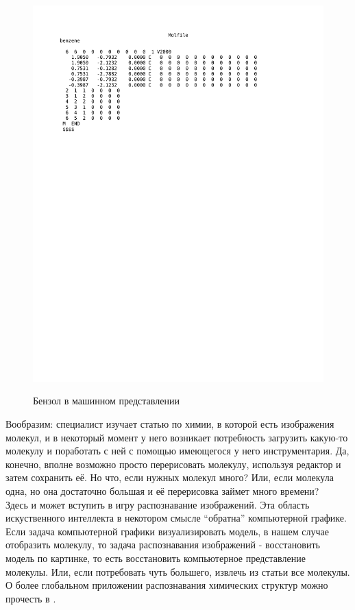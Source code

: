 \begin{figure}[h]
{\includegraphics[scale=0.6, clip, trim = 10mm 180mm 45mm 10mm]{img/benzene_molfile.pdf}}
\caption{Бензол в машинном представлении}
\end{figure}

\noindent Вообразим: специалист изучает статью по химии, в которой есть изображения молекул, и в некоторый момент у него возникает 
потребность загрузить какую-то молекулу и поработать с ней с помощью имеющегося у него инструментария. Да, конечно,
вполне возможно просто перерисовать молекулу, используя редактор и затем сохранить её. Но что, если нужных молекул много? 
Или, если молекула одна, но она достаточно большая и её перерисовка займет много времени? \\ 

\noindent 
Здесь и может вступить в игру распознавание изображений. Эта область искуственного интеллекта в некотором смысле ``обратна'' 
компьютерной графике. Если задача компьютерной графики визуализировать модель, в нашем случае отобразить молекулу, то задача 
распознавания изображений - восстановить модель по картинке, то есть восстановить компьютерное представление молекулы. Или, 
если потребовать чуть большего, извлечь из статьи все молекулы. О более глобальном приложении распознавания химических структур 
можно прочесть в \cite{pavlov}.\\

